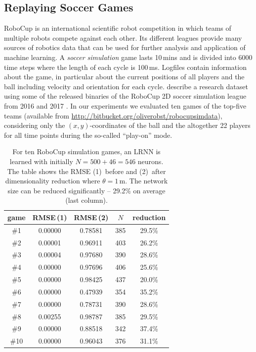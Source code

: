 \documentclass[twoside,11pt]{article}
\theoremstyle{definition}
\newcommand{\head}[1]{\multicolumn{1}{c}{#1}}
\begin{document}
\subsection{Replaying Soccer Games}\label{soccer}

RoboCup \citep{KA+97} is an international scientific robot competition in which
teams of multiple robots compete against each other. Its different leagues
provide many sources of robotics data that can be used for further analysis and
application of machine learning. A \emph{soccer simulation} game lasts 10\,mins and is
divided into 6000 time steps where the length of each cycle is 100\,ms. Logfiles
contain information about the game, in particular about the current positions of
all players and the ball including velocity and orientation for each cycle.
\citet{MO+19} describe a research dataset using some of the released binaries of
the RoboCup 2D soccer simulation league \citep{CDF+03,GFG16} from 2016 and 2017
\citep{MO+18}. In our experiments we evaluated ten games of the
top-five teams (available from \url{http://bitbucket.org/oliverobst/robocupsimdata}),
considering only the $(x,y)$-coordinates of the ball and the altogether 22
players for all time points during the so-called \enquote{play-on}
mode.

\begin{table}
\centering
{}%
\begin{tabular}[b]{cSScc}
	\toprule
	\head{game} & \head{RMSE\,(1)} & \head{RMSE\,(2)} & \head{$N$} & \head{reduction}\\ \midrule
	\#1 & 0.00000 & 0.78581 & 385 & 29.5\%\\
	\#2 & 0.00001 & 0.96911 & 403 & 26.2\% \\
	\#3 & 0.00004 & 0.97680 & 390 & 28.6\% \\
	\#4 & 0.00000 & 0.97696 & 406 & 25.6\% \\
	\#5 & 0.00000 & 0.98425 & 437 & 20.0\% \\
	\#6 & 0.00000 & 0.47939 & 354 & 35.2\% \\
	\#7 & 0.00000 & 0.78731 & 390 & 28.6\% \\
	\#8 & 0.00255 & 0.98787 & 385 & 29.5\% \\
	\#9 & 0.00000 & 0.88518 & 342 & 37.4\% \\
	\#10 & 0.00000 & 0.96043 & 376 & 31.1\% \\
	\bottomrule
  \end{tabular}
  \caption{For ten RoboCup simulation games, an LRNN is learned with initially
	$N = 500+46 = 546$ neurons. The table shows the RMSE
	(1)~before and (2)~after dimensionality reduction where $\theta=1$\,m. The
	network size can be reduced significantly -- 29.2\% on average
	(last column).}
  \label{robocup}
\end{table}
\end{document}
